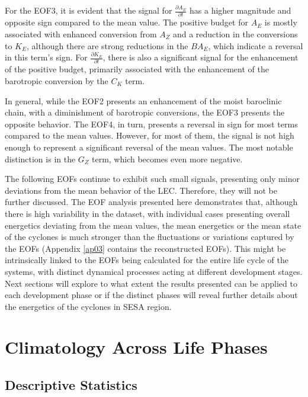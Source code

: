 For the EOF3, it is evident that the signal for $\frac{\partial A_E}{\partial t}$ has a higher magnitude and opposite sign compared to the mean value. The positive budget for $A_E$ is mostly associated with enhanced conversion from $A_Z$ and a reduction in the conversions to $K_E$, although there are strong reductions in the $BA_E$, which indicate a reversal in this term's sign. For $\frac{\partial K_E}{\partial t}$, there is also a significant signal for the enhancement of the positive budget, primarily associated with the enhancement of the barotropic conversion by the $C_K$ term. 

In general, while the EOF2 presents an enhancement of the moist baroclinic chain, with a diminishment of barotropic conversions, the EOF3 presents the opposite behavior. The EOF4, in turn, presents a reversal in sign for most terms compared to the mean values. However, for most of them, the signal is not high enough to represent a significant reversal of the mean values. The most notable distinction is in the $G_Z$ term, which becomes even more negative. 

The following EOFs continue to exhibit such small signals, presenting only minor deviations from the mean behavior of the LEC. Therefore, they will not be further discussed. The EOF analysis presented here demonstrates that, although there is high variability in the dataset, with individual cases presenting overall energetics deviating from the mean values, the mean energetics or the mean state of the cyclones is much stronger than the fluctuations or variations captured by the EOFs (Appendix \ref{ap03} contains the reconstructed EOFs). This might be intrinsically linked to the EOFs being calculated for the entire life cycle of the systems, with distinct dynamical processes acting at different development stages. Next sections will explore to what extent the results presented can be applied to each development phase or if the distinct phases will reveal further details about the energetics of the cyclones in SESA region.

\section{Climatology Across Life Phases}\label{sec:climatology_phases}

\subsection{Descriptive Statistics}\label{sec:statistics_phases}

